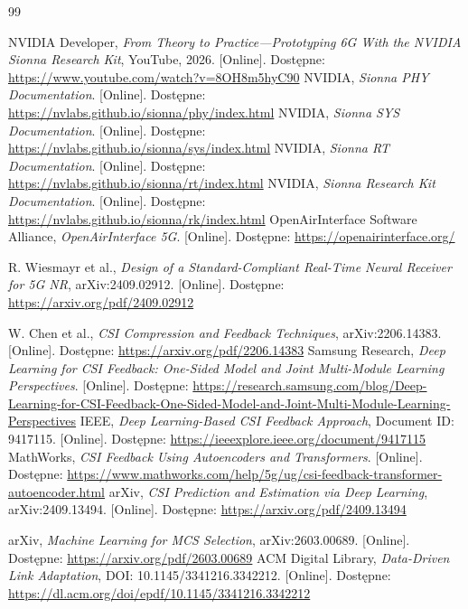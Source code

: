 \documentclass[12pt, a4paper]{article}
\begin{document}
\newpage
\begin{thebibliography}{99}

 NVIDIA Developer, \textit{From Theory to Practice—Prototyping 6G With the NVIDIA Sionna Research Kit}, YouTube, 2026. [Online]. Dostępne: \url{https://www.youtube.com/watch?v=8OH8m5hyC90}
 NVIDIA, \textit{Sionna PHY Documentation}. [Online]. Dostępne: \url{https://nvlabs.github.io/sionna/phy/index.html}
 NVIDIA, \textit{Sionna SYS Documentation}. [Online]. Dostępne: \url{https://nvlabs.github.io/sionna/sys/index.html}
 NVIDIA, \textit{Sionna RT Documentation}. [Online]. Dostępne: \url{https://nvlabs.github.io/sionna/rt/index.html}
 NVIDIA, \textit{Sionna Research Kit Documentation}. [Online]. Dostępne: \url{https://nvlabs.github.io/sionna/rk/index.html}
 OpenAirInterface Software Alliance, \textit{OpenAirInterface 5G}. [Online]. Dostępne: \url{https://openairinterface.org/}

 R. Wiesmayr et al., \textit{Design of a Standard-Compliant Real-Time Neural Receiver for 5G NR}, arXiv:2409.02912. [Online]. Dostępne: \url{https://arxiv.org/pdf/2409.02912}

 W. Chen et al., \textit{CSI Compression and Feedback Techniques}, arXiv:2206.14383. [Online]. Dostępne: \url{https://arxiv.org/pdf/2206.14383}
 Samsung Research, \textit{Deep Learning for CSI Feedback: One-Sided Model and Joint Multi-Module Learning Perspectives}. [Online]. Dostępne: \url{https://research.samsung.com/blog/Deep-Learning-for-CSI-Feedback-One-Sided-Model-and-Joint-Multi-Module-Learning-Perspectives}
 IEEE, \textit{Deep Learning-Based CSI Feedback Approach}, Document ID: 9417115. [Online]. Dostępne: \url{https://ieeexplore.ieee.org/document/9417115}
 MathWorks, \textit{CSI Feedback Using Autoencoders and Transformers}. [Online]. Dostępne: \url{https://www.mathworks.com/help/5g/ug/csi-feedback-transformer-autoencoder.html}
 arXiv, \textit{CSI Prediction and Estimation via Deep Learning}, arXiv:2409.13494. [Online]. Dostępne: \url{https://arxiv.org/pdf/2409.13494}

 arXiv, \textit{Machine Learning for MCS Selection}, arXiv:2603.00689. [Online]. Dostępne: \url{https://arxiv.org/pdf/2603.00689}
 ACM Digital Library, \textit{Data-Driven Link Adaptation}, DOI: 10.1145/3341216.3342212. [Online]. Dostępne: \url{https://dl.acm.org/doi/epdf/10.1145/3341216.3342212}


\end{thebibliography}
\end{document}
